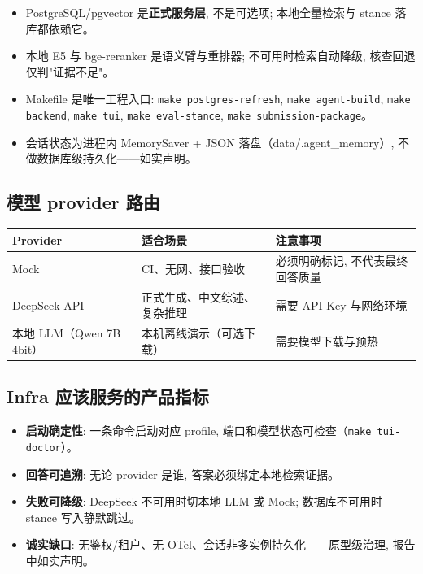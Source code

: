 \begin{plainbox}
\begin{itemize}
  \item PostgreSQL/pgvector 是\textbf{正式服务层}, 不是可选项; 本地全量检索与 stance 落库都依赖它。
  \item 本地 E5 与 bge-reranker 是语义臂与重排器; 不可用时检索自动降级, 核查回退仅判"证据不足"。
  \item Makefile 是唯一工程入口: \texttt{make postgres-refresh}, \texttt{make agent-build},
        \texttt{make backend}, \texttt{make tui}, \texttt{make eval-stance}, \texttt{make submission-package}。
  \item 会话状态为进程内 MemorySaver + JSON 落盘（data/.agent\_memory）, 不做数据库级持久化——如实声明。
\end{itemize}
\end{plainbox}

\subsection{模型 provider 路由}

\begin{center}
\begin{tabularx}{\textwidth}{p{33mm}X X}
\toprule
Provider & 适合场景 & 注意事项 \\
\midrule
Mock & CI、无网、接口验收 & 必须明确标记, 不代表最终回答质量 \\
DeepSeek API & 正式生成、中文综述、复杂推理 & 需要 API Key 与网络环境 \\
本地 LLM（Qwen 7B 4bit） & 本机离线演示（可选下载） & 需要模型下载与预热 \\
\bottomrule
\end{tabularx}
\end{center}

\subsection{Infra 应该服务的产品指标}

\begin{plainbox}
\begin{itemize}
  \item \textbf{启动确定性}: 一条命令启动对应 profile, 端口和模型状态可检查（\texttt{make tui-doctor}）。
  \item \textbf{回答可追溯}: 无论 provider 是谁, 答案必须绑定本地检索证据。
  \item \textbf{失败可降级}: DeepSeek 不可用时切本地 LLM 或 Mock; 数据库不可用时 stance 写入静默跳过。
  \item \textbf{诚实缺口}: 无鉴权/租户、无 OTel、会话非多实例持久化——原型级治理, 报告中如实声明。
\end{itemize}
\end{plainbox}

\clearpage